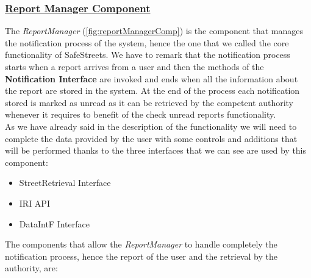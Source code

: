 		\subsubsection[Report Manager Component]{\hyperlink{toc}{Report Manager Component}}
			\label{sec:reportManagerComponent}
			
			The \emph{ReportManager} (\autoref{fig:reportManagerComp}) is the component that manages the notification process of the system, hence the one that we called the core functionality of SafeStreets. We have to remark that the notification process starts when a report arrives from a user and then the methods of the \textbf{Notification Interface} are invoked and ends when all the information about the report are stored in the system. At the end of the process each notification stored is marked as unread as it can be retrieved by the competent authority whenever it requires to benefit of the check unread reports functionality.\\
			
			As we have already said in the description of the functionality we will need to complete the data provided by the user with some controls and additions that will be performed thanks to the three interfaces that we can see are used by this component:
			
			\begin{itemize}
				\item StreetRetrieval Interface
				\item IRI API
				\item DataIntF Interface
			\end{itemize}
		
			The components that allow the \emph{ReportManager} to handle completely the notification process, hence the report of the user and the retrieval by the authority, are:
			
